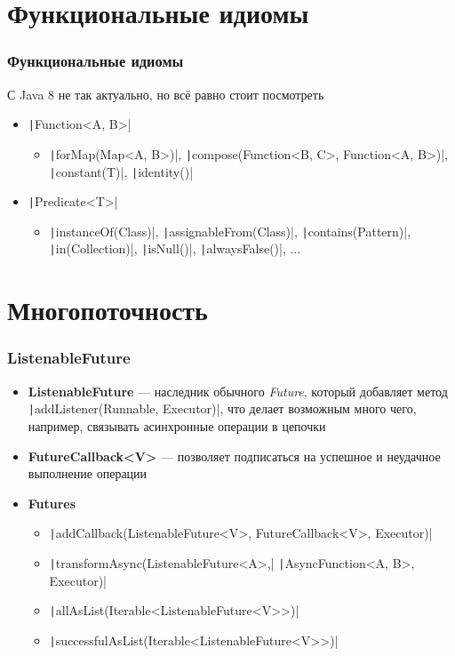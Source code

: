 \documentclass[xetex,mathserif,serif]{beamer}
\begin{document}
	\section{Функциональные идиомы}

	\begin{frame}
		\frametitle{Функциональные идиомы}
		С Java 8 не так актуально, но всё равно стоит посмотреть
		\begin{itemize}
			\item \texttt|Function<A, B>|
			\begin{itemize}
				\item \texttt|forMap(Map<A, B>)|, \texttt|compose(Function<B, C>, Function<A, B>)|, \texttt|constant(T)|, \texttt|identity()|
			\end{itemize}
			\item \texttt|Predicate<T>|
			\begin{itemize}
				\item \texttt|instanceOf(Class)|, \texttt|assignableFrom(Class)|, \texttt|contains(Pattern)|, \texttt|in(Collection)|, \texttt|isNull()|, \texttt|alwaysFalse()|, ...
			\end{itemize}
		\end{itemize}
	\end{frame}

	\section{Многопоточность}

	\begin{frame}
		\frametitle{ListenableFuture}
		\begin{itemize}
			\item \textbf{ListenableFuture} --- наследник обычного \textit{Future}, который добавляет метод \texttt|addListener(Runnable, Executor)|, что делает возможным много чего, например, связывать асинхронные операции в цепочки
			\item \textbf{FutureCallback<V>} --- позволяет подписаться на успешное и неудачное выполнение операции
			\item \textbf{Futures} 
			\begin{itemize}
				\item \texttt|addCallback(ListenableFuture<V>, FutureCallback<V>, Executor)|
				\item \texttt|transformAsync(ListenableFuture<A>,| \texttt|AsyncFunction<A, B>, Executor)|
				\item \texttt|allAsList(Iterable<ListenableFuture<V>>)|
				\item \texttt|successfulAsList(Iterable<ListenableFuture<V>>)|
			\end{itemize}
		\end{itemize}
	\end{frame}
	
\end{document}
